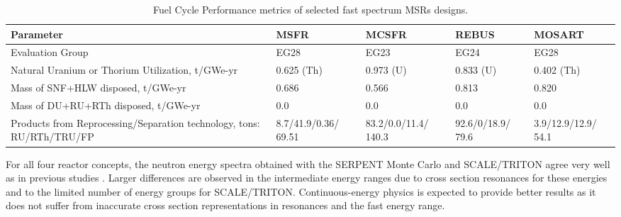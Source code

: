 \documentclass[letterpaper]{mandc2019}
\begin{document}
\begin{table}[h!]
  \centering
  \caption{Fuel Cycle Performance metrics of selected fast spectrum \glspl{MSR} designs.}
  \label{table:metrics}
  \begin{tabular}{p{} p{} p{} p{} p{}} \toprule
   Parameter &  \gls{MSFR} & \gls{MCSFR} & REBUS & \gls{MOSART} \\ \midrule
   Evaluation Group	&  EG28 & EG23 & EG24 & EG28   \\
   Natural Uranium or Thorium Utilization, t/GWe-yr & 0.625 (Th) & 0.973 (U) & 0.833 (U) & 0.402 (Th) \\
   Mass of \gls{SNF}+\gls{HLW} disposed, t/GWe-yr & 0.686 & 0.566 & 0.813 &  0.820 \\
   Mass of DU+RU+RTh disposed, t/GWe-yr & 0.0 & 0.0 & 0.0 &  0.0 \\
   Products from Reprocessing/Separation technology, tons: \gls{RU}/\gls{RTh}/\gls{TRU}/\gls{FP} &
   8.7/41.9/0.36/ 69.51 &  83.2/0.0/11.4/ 140.3 & 92.6/0/18.9/ 79.6 & 3.9/12.9/12.9/ 54.1  \\
 \bottomrule
  \end{tabular}
  \vspace{-0.2in}
\end{table}

For all four reactor concepts, the neutron energy spectra obtained with the SERPENT Monte Carlo and SCALE/TRITON agree very well as in previous studies \cite{betzler_fuel_2018}. Larger differences are observed in the intermediate energy ranges due to cross section resonances for these energies and to the limited number of energy groups for SCALE/TRITON. Continuous-energy physics is expected to provide better results as it does not suffer from inaccurate cross section representations in resonances and the fast energy range.
\end{document}
